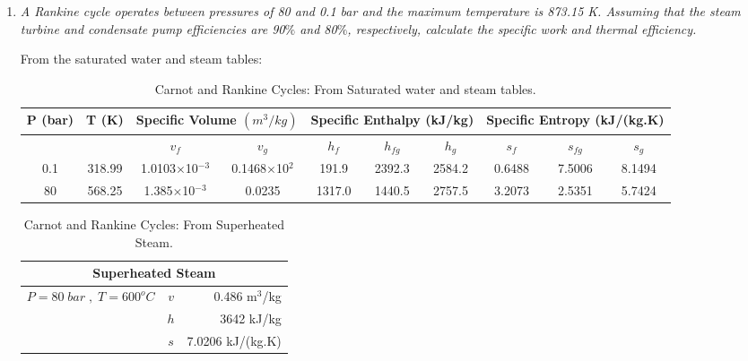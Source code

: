 \begin{enumerate}
\item {\it A Rankine cycle operates between pressures of 80 and 0.1 bar and the maximum temperature is 873.15 K. Assuming that the steam turbine and condensate pump efficiencies are 90$\%$ and 80$\%$, respectively, calculate the specific work and thermal efficiency.}\label{Example_01_02}

From the saturated water and steam tables:

\begin{center}
\begin{table}[h]
\begin{tabular}{||c|c|c c|c c c|c c c||} 
\hline\hline
{\bf P (bar)} & {\bf T (K)} & \multicolumn{2}{|c|}{{\bf Specific Volume $\left(m^{3}/kg\right)$}} & \multicolumn{3}{|c|}{{\bf Specific Enthalpy (kJ/kg)}} & \multicolumn{3}{|c||}{{\bf Specific Entropy (kJ/(kg.K)}}  \\
\hline
              &             &  $v_{f}$                  &    $v_{g}$                              &  $h_{f}$    &  $h_{fg}$  &   $h_{g}$                 &  $s_{f}$  &  $s_{fg}$    &  $s_{g}$  \\
\hline\hline
0.1           & 318.99      &1.0103$\times$10$^{-3}$    & 0.1468$\times$10$^{2}$                  & 191.9   & 2392.3    & 2584.2              & 0.6488 & 7.5006  & 8.1494 \\
80            & 568.25      &1.385$\times$10$^{-3}$     & 0.0235                                  & 1317.0 & 1440.5   & 2757.5               & 3.2073 & 2.5351  & 5.7424  \\
\hline\hline
\end{tabular}
\caption{Carnot and Rankine Cycles: From Saturated water and steam tables.}
\label{Example01_01:Table2}
\end{table}
\end{center}


\begin{table}[h]
\begin{center}
\begin{tabular}{c c r}
\multicolumn{3}{c}{Superheated Steam} \\
\hline
\multirow{3}{*}{$P=80\;bar\;,\;T= 600^{o}C$} & $v$ & 0.486 m$^{3}$/kg \\
                           & $h$ & 3642 kJ/kg \\
                           & $s$ & 7.0206 kJ/(kg.K)\\
\hline
\end{tabular}
\end{center}
\caption{Carnot and Rankine Cycles: From Superheated Steam.}
\label{Example01_01:Table23}
\end{table}


\end{enumerate}
